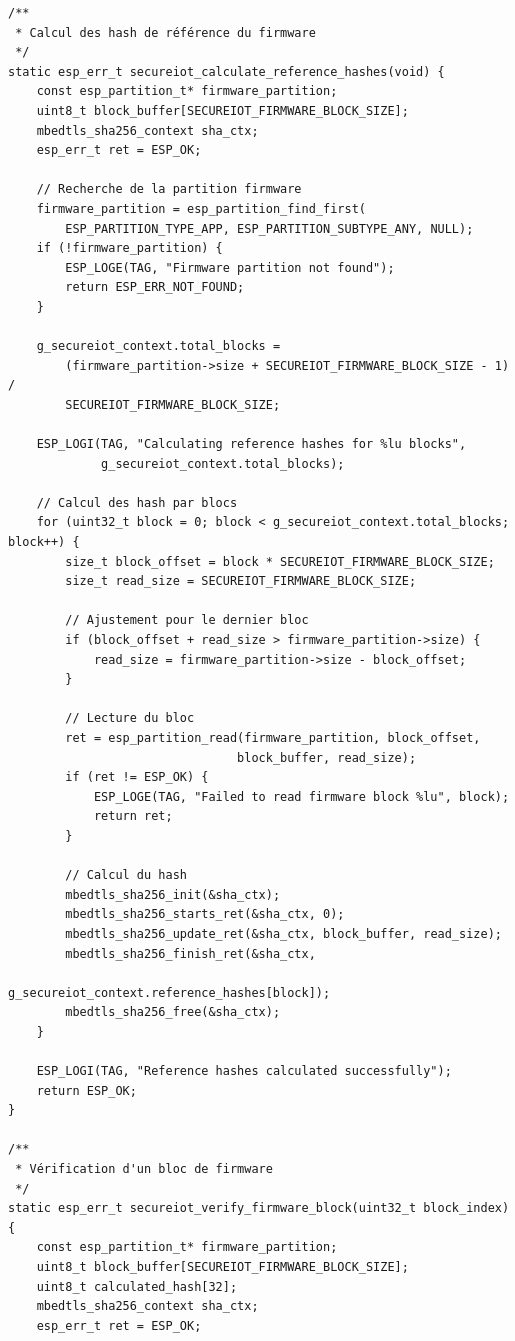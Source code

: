 \begin{lstlisting}[caption={Implémentation complète du module de vérification d'intégrité pour ESP32}]
/**
 * Calcul des hash de référence du firmware
 */
static esp_err_t secureiot_calculate_reference_hashes(void) {
    const esp_partition_t* firmware_partition;
    uint8_t block_buffer[SECUREIOT_FIRMWARE_BLOCK_SIZE];
    mbedtls_sha256_context sha_ctx;
    esp_err_t ret = ESP_OK;
    
    // Recherche de la partition firmware
    firmware_partition = esp_partition_find_first(
        ESP_PARTITION_TYPE_APP, ESP_PARTITION_SUBTYPE_ANY, NULL);
    if (!firmware_partition) {
        ESP_LOGE(TAG, "Firmware partition not found");
        return ESP_ERR_NOT_FOUND;
    }
    
    g_secureiot_context.total_blocks = 
        (firmware_partition->size + SECUREIOT_FIRMWARE_BLOCK_SIZE - 1) / 
        SECUREIOT_FIRMWARE_BLOCK_SIZE;
    
    ESP_LOGI(TAG, "Calculating reference hashes for %lu blocks", 
             g_secureiot_context.total_blocks);
    
    // Calcul des hash par blocs
    for (uint32_t block = 0; block < g_secureiot_context.total_blocks; block++) {
        size_t block_offset = block * SECUREIOT_FIRMWARE_BLOCK_SIZE;
        size_t read_size = SECUREIOT_FIRMWARE_BLOCK_SIZE;
        
        // Ajustement pour le dernier bloc
        if (block_offset + read_size > firmware_partition->size) {
            read_size = firmware_partition->size - block_offset;
        }
        
        // Lecture du bloc
        ret = esp_partition_read(firmware_partition, block_offset, 
                                block_buffer, read_size);
        if (ret != ESP_OK) {
            ESP_LOGE(TAG, "Failed to read firmware block %lu", block);
            return ret;
        }
        
        // Calcul du hash
        mbedtls_sha256_init(&sha_ctx);
        mbedtls_sha256_starts_ret(&sha_ctx, 0);
        mbedtls_sha256_update_ret(&sha_ctx, block_buffer, read_size);
        mbedtls_sha256_finish_ret(&sha_ctx, 
                                  g_secureiot_context.reference_hashes[block]);
        mbedtls_sha256_free(&sha_ctx);
    }
    
    ESP_LOGI(TAG, "Reference hashes calculated successfully");
    return ESP_OK;
}

/**
 * Vérification d'un bloc de firmware
 */
static esp_err_t secureiot_verify_firmware_block(uint32_t block_index) {
    const esp_partition_t* firmware_partition;
    uint8_t block_buffer[SECUREIOT_FIRMWARE_BLOCK_SIZE];
    uint8_t calculated_hash[32];
    mbedtls_sha256_context sha_ctx;
    esp_err_t ret = ESP_OK;
    

\end{lstlisting}
